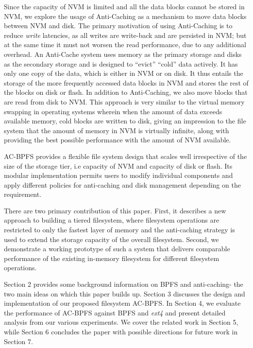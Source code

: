 Since the capacity of NVM is limited and all the data blocks cannot be stored in NVM, we explore the usage of Anti-Caching \cite{c13} as a mechanism to move data blocks between NVM and disk. The primary motivation of using Anti-Caching is to reduce \textit{write} latencies, as all writes are write-back and are persisted in NVM; but at the same time it must not worsen the read performance, due to any additional overhead. An Anti-Cache system uses memory as the primary storage and disks as the secondary storage and is designed to “evict” “cold” data actively. It has only one copy of the data, which is either in NVM or on disk. It thus entails the storage of the more frequently accessed data blocks in NVM and stores the rest of the blocks on disk or flash. In addition to Anti-Caching, we also move blocks that are read from disk to NVM. This approach is very similar to the virtual memory swapping in operating systems wherein when the amount of data exceeds available memory, cold blocks are written to disk, giving an impression to the file system that the amount of memory in NVM is virtually infinite, along with providing the best possible performance with the amount of NVM available.

AC-BPFS provides a flexible file system design that scales well irrespective of the size of the storage tier, i.e capacity of NVM and capacity of disk or flash. Its modular implementation permits users to modify individual components and apply different policies for anti-caching and disk management depending on the requirement.

There are two primary contribution of this paper. First, it describes a new approach to building a tiered filesystem, where  filesystem operations are restricted to only the fastest layer of memory and the anti-caching strategy is used to extend the storage capacity of the overall filesystem. Second, we demonstrate a working prototype of such a system that delivers comparable performance of the existing in-memory filesystem for different filesystem operations.

Section 2 provides some background information on BPFS and anti-caching- the two main ideas on which this paper builds up. Section 3 discusses the design and implementation of our proposed filesystem AC-BPFS. In Section 4, we evaluate the performance of AC-BPFS against BPFS and \textit{ext4} and present detailed analysis from our various experiments. We cover the related work in Section 5, while Section 6 concludes the paper with possible directions for future work in Section 7.
